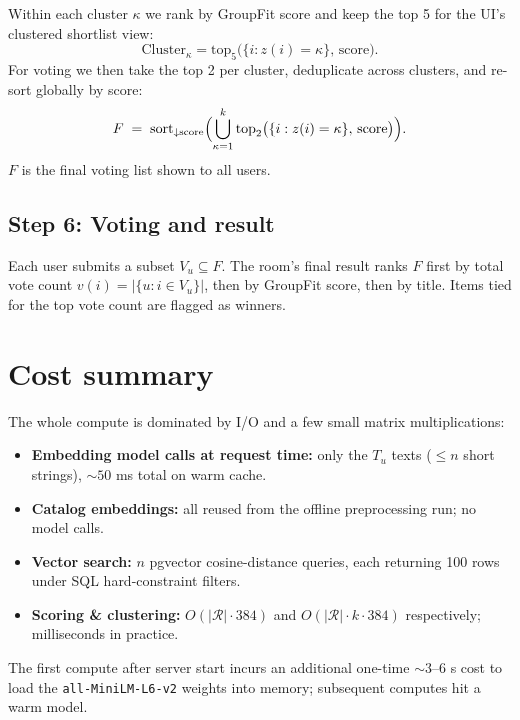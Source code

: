 \documentclass[11pt]{article}
\begin{document}
Within each cluster $\kappa$ we rank by GroupFit score and keep the
top 5 for the UI's clustered shortlist view:
\[
  \mathrm{Cluster}_\kappa = \mathrm{top}_5\bigl(\{i : z(i) = \kappa\},\,
                                                 \mathrm{score}\bigr).
\]
For voting we then take the top 2 per cluster, deduplicate across
clusters, and re-sort globally by score:
\[
  F \;=\; \mathrm{sort}_{\downarrow\mathrm{score}}\Bigl(
    \bigcup_{\kappa=1}^{k} \mathrm{top}_2\bigl(\{i : z(i) = \kappa\},\,
                                                \mathrm{score}\bigr)
  \Bigr).
\]
$F$ is the final voting list shown to all users.

\subsection{Step 6: Voting and result}

Each user submits a subset $V_u \subseteq F$. The room's final result
ranks $F$ first by total vote count
$v(i) = |\{u : i \in V_u\}|$, then by GroupFit score, then by title.
Items tied for the top vote count are flagged as winners.

\section{Cost summary}

The whole compute is dominated by I/O and a few small matrix
multiplications:
\begin{itemize}[leftmargin=2em]
  \item \textbf{Embedding model calls at request time:} only the
        $T_u$ texts (\(\leq n\) short strings), $\sim 50$ ms total
        on warm cache.
  \item \textbf{Catalog embeddings:} all reused from the offline
        preprocessing run; no model calls.
  \item \textbf{Vector search:} $n$ pgvector cosine-distance queries,
        each returning 100 rows under SQL hard-constraint filters.
  \item \textbf{Scoring \& clustering:} $O(|\mathcal{R}| \cdot 384)$
        and $O(|\mathcal{R}| \cdot k \cdot 384)$ respectively;
        milliseconds in practice.
\end{itemize}

The first compute after server start incurs an additional one-time
$\sim 3$--$6$ s cost to load the
\texttt{all-MiniLM-L6-v2} weights into memory; subsequent computes
hit a warm model.
\end{document}
